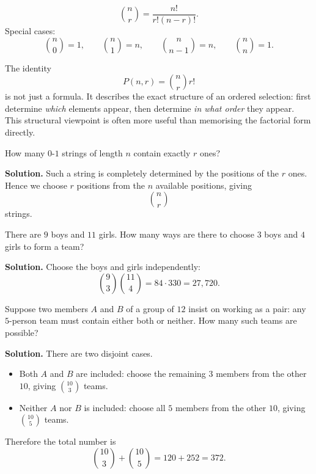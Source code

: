 \begin{keyformula}[title={Binomial coefficient formula}]
\[
\binom{n}{r}=\frac{n!}{r!(n-r)!}.
\]
Special cases:
\[
\binom{n}{0}=1,\qquad \binom{n}{1}=n,\qquad \binom{n}{n-1}=n,\qquad \binom{n}{n}=1.
\]
\end{keyformula}

\begin{extension}[title={Canonical choose-then-order decomposition}]
The identity
\[
P(n,r)=\binom{n}{r}r!
\]
is not just a formula. It describes the exact structure of an ordered selection: first determine \emph{which} elements appear, then determine \emph{in what order} they appear. This structural viewpoint is often more useful than memorising the factorial form directly.
\end{extension}

\begin{examplebox}[title={Bit strings with exactly $r$ ones}]
How many $0$-$1$ strings of length $n$ contain exactly $r$ ones?

\textbf{Solution.}
Such a string is completely determined by the positions of the $r$ ones. Hence we choose $r$ positions from the $n$ available positions, giving
\[
\binom{n}{r}
\]
strings.
\end{examplebox}

\begin{examplebox}[title={Selecting a team}]
There are $9$ boys and $11$ girls. How many ways are there to choose $3$ boys and $4$ girls to form a team?

\textbf{Solution.}
Choose the boys and girls independently:
\[
\binom{9}{3}\binom{11}{4}=84\cdot 330=27{,}720.
\]
\end{examplebox}

\begin{examplebox}[title={A required pair}]
Suppose two members $A$ and $B$ of a group of $12$ insist on working as a pair: any $5$-person team must contain either both or neither. How many such teams are possible?

\textbf{Solution.}
There are two disjoint cases.
\begin{itemize}[leftmargin=*]
    \item Both $A$ and $B$ are included: choose the remaining $3$ members from the other $10$, giving $\binom{10}{3}$ teams.
    \item Neither $A$ nor $B$ is included: choose all $5$ members from the other $10$, giving $\binom{10}{5}$ teams.
\end{itemize}
Therefore the total number is
\[
\binom{10}{3}+\binom{10}{5}=120+252=372.
\]
\end{examplebox}

